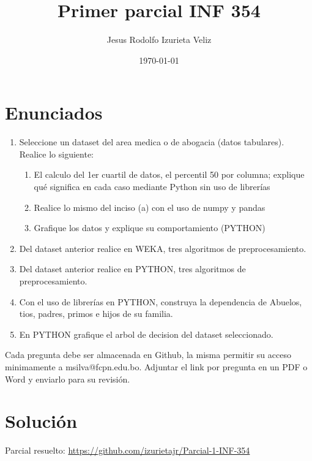 \documentclass[letter]{article}
\author{Jesus Rodolfo Izurieta Veliz}
\date{\today}
\title{Primer parcial INF 354}
\begin{document}
\maketitle


\section{Enunciados}
\label{sec:org2a863ef}

\begin{enumerate}
\item Seleccione un dataset del area medica o de abogacia (datos tabulares). Realice lo siguiente:

\begin{enumerate}
\item El calculo del 1er cuartil de datos, el percentil 50 por columna; explique qué significa en cada caso mediante Python sin uso de librerías

\item Realice lo mismo del inciso (a) con el uso de numpy y pandas

\item Grafique los datos y explique su comportamiento (PYTHON)
\end{enumerate}

\item Del dataset anterior realice en WEKA, tres algoritmos de preprocesamiento.

\item Del dataset anterior realice en PYTHON, tres algoritmos de preprocesamiento.

\item Con el uso de librerías en PYTHON, construya la dependencia de Abuelos, tios, padres, primos e hijos de su familia.

\item En PYTHON grafique el arbol de decision del dataset seleccionado.
\end{enumerate}

Cada pregunta debe ser almacenada en Github, la misma permitir su acceso minimamente a msilva@fcpn.edu.bo. Adjuntar el link por pregunta en un PDF o Word y enviarlo para su revisión.

\section{Solución}
\label{sec:org433c106}
Parcial resuelto: \url{https://github.com/izurietajr/Parcial-1-INF-354}
\end{document}
